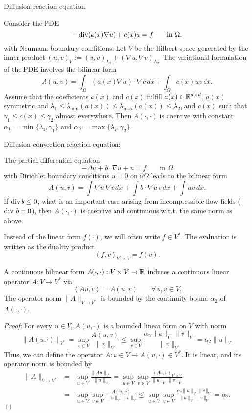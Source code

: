 \begin{example} 
Diffusion-reaction equation: 
\end{example}
\noindent
Consider the PDE
$$
-\operatorname{div} (a(x) \nabla u) + c(x) u = f \qquad \mbox{in } \Omega,
$$
with Neumann boundary conditions. Let $V$ be the Hilbert space generated 
by the inner product $(u,v)_V := (u,v)_{L_2}+ (\nabla u , \nabla v)_{L_2}$. 
The variational formulation of the PDE involves the bilinear form
$$
A(u,v) = \int_{\Omega} (a(x) \nabla u) \cdot \nabla v \, dx + \int_\Omega c(x) u v \, dx.
$$
Assume that the coefficients $a(x)$ and $c(x)$ fulfill 
$a(x) \in {\mathbb R}^{d \times d}$, $a(x)$ symmetric and $\lambda_1 \leq \lambda_{\min} (a(x)) \leq \lambda_{\max} (a(x)) \leq \lambda_2$, and 
$c(x)$ such that $\gamma_1 \leq c(x) \leq \gamma_2$ almost everywhere. 
Then $A(\cdot,\cdot)$ is coercive with constant
$\alpha_1 = \min \{ \lambda_1, \gamma_1 \}$ and $\alpha_2 = \max \{ \lambda_2, \gamma_2 \}$.
\begin{example}  \label{example_diffconv}
Diffusion-convection-reaction equation:
\end{example}
\noindent
The partial differential equation
$$
-\Delta u + b \cdot \nabla u + u  = f \qquad \mbox{in} \; \Omega
$$
with Dirichlet boundary conditions $u = 0$ on $\partial \Omega$ leads to the
bilinear form
$$
A(u,v) = \int \nabla u \, \nabla v \, dx + \int b \cdot \nabla u \, v \, dx + \int u v \, dx.
$$
If $\operatorname{div} b \leq 0$, what is an important case arising from incompressible flow
fields ($\operatorname{div} \, b = 0$), then $A(\cdot,\cdot)$ is coercive and continuous w.r.t. the same norm as above.

\bigskip

Instead of the linear form $f(\cdot)$, we will often write $f \in V^\ast$. The evaluation is written as the duality product 
$$
\left< f , v \right>_{V^\ast \times V} = f(v).
$$

\begin{lemma}A continuous bilinear form $A(\cdot,\cdot) : V \times V \rightarrow {\mathbb R}$
induces a continuous linear operator $A : V \rightarrow V^\ast$ via
$$
\left< A u, v \right> = A(u,v) \qquad \forall \, u,v \in V.
$$
The operator norm $\| A \|_{V \rightarrow V^\ast}$ is bounded by the continuity bound $\alpha_2$ of $A(\cdot,\cdot)$. 
\end{lemma}
\noindent
{\em Proof:} For every $u \in V$, $A(u,\cdot)$ is a bounded linear form on $V$
with norm
$$
\| A(u,\cdot) \|_{V^\ast} = 
\sup_{v \in V} \frac{A(u,v)}{ \| v \|_V} 
\leq \sup_{v \in V} \frac{\alpha_2 \| u \|_V \, \| v \|_V }{ \| v \|_V} 
= \alpha_2 \| u \|_V
$$
Thus, we can define the operator $A : u \in V \rightarrow A(u,\cdot) \in V^\ast$. 
It is linear, and its operator norm is bounded by
\begin{eqnarray*}
\| A \|_{V \rightarrow V^\ast} & = &
\sup_{u\in V} \frac{ \| A u \|_{V^\ast}}{\| u \|_V} =
\sup_{u\in V} \sup_{v \in V} \frac{ \left< A u, v\right>_{V^\ast \times V} } {\| u \|_V \, \| v \|_V} \\
& = & \sup_{u\in V} \sup_{v \in V} \frac{ A (u,v) } {\| u \|_V \, \| v \|_V} \leq
\sup_{u\in V} \sup_{v\in V} \frac{ \alpha_2 \| u \|_V \| v \|_V } {\| u \|_V \, \| v \|_V} = \alpha_2.
\end{eqnarray*}
\hfill $\Box$

